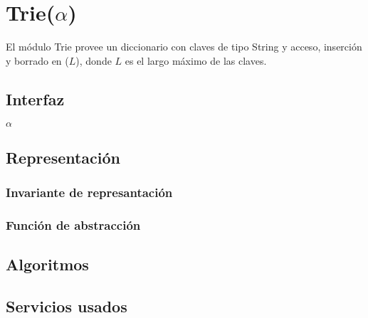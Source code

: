 \section{Trie($\alpha$)}

El módulo Trie provee un diccionario con claves de tipo String y acceso, inserción y borrado en \bigo($L$), donde $L$ es el largo máximo de las claves.

\subsection{Interfaz}

\begin{iparamformales}{$\alpha$}

\end{iparamformales}

\iusa{}

\subsection{Representación}

\subsubsection{Invariante de represantación}

\subsubsection{Función de abstracción}

\subsection{Algoritmos}

\subsection{Servicios usados}


